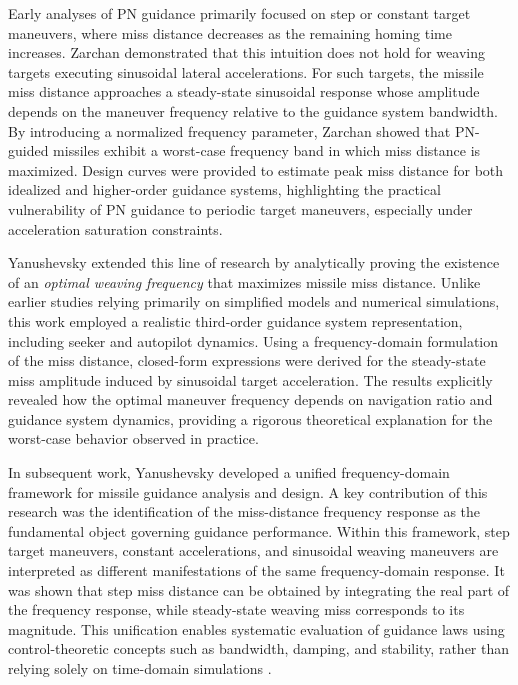 \documentclass[11pt,a4paper]{article}
\begin{document}
Early analyses of PN guidance primarily focused on step or constant target maneuvers, where miss distance decreases as the remaining homing time increases. Zarchan\cite{Zarchan1995} demonstrated that this intuition does not hold for weaving targets executing sinusoidal lateral accelerations. For such targets, the missile miss distance approaches a steady-state sinusoidal response whose amplitude depends on the maneuver frequency relative to the guidance system bandwidth. By introducing a normalized frequency parameter, Zarchan showed that PN-guided missiles exhibit a worst-case frequency band in which miss distance is maximized. Design curves were provided to estimate peak miss distance for both idealized and higher-order guidance systems, highlighting the practical vulnerability of PN guidance to periodic target maneuvers, especially under acceleration saturation constraints.

Yanushevsky\cite{Yanushevsky2004} extended this line of research by analytically proving the existence of an \emph{optimal weaving frequency} that maximizes missile miss distance. Unlike earlier studies relying primarily on simplified models and numerical simulations, this work employed a realistic third-order guidance system representation, including seeker and autopilot dynamics. Using a frequency-domain formulation of the miss distance, closed-form expressions were derived for the steady-state miss amplitude induced by sinusoidal target acceleration. The results explicitly revealed how the optimal maneuver frequency depends on navigation ratio and guidance system dynamics, providing a rigorous theoretical explanation for the worst-case behavior observed in practice.

In subsequent work, Yanushevsky\cite{Yanushevsky2006,Yanushevsky2007} developed a unified frequency-domain framework for missile guidance analysis and design. A key contribution of this research was the identification of the miss-distance frequency response as the fundamental object governing guidance performance. Within this framework, step target maneuvers, constant accelerations, and sinusoidal weaving maneuvers are interpreted as different manifestations of the same frequency-domain response. It was shown that step miss distance can be obtained by integrating the real part of the frequency response, while steady-state weaving miss corresponds to its magnitude. This unification enables systematic evaluation of guidance laws using control-theoretic concepts such as bandwidth, damping, and stability, rather than relying solely on time-domain simulations \cite{Yanushevsky2007}.
\end{document}
